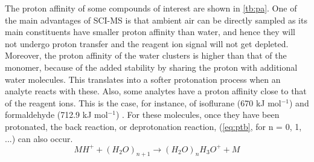 The proton affinity of some compounds of interest are shown in \autoref{tb:pa}. One of the main advantages of SCI-MS is that ambient air can be directly sampled as its main constituents have smaller proton affinity than water, %
and hence they will not undergo proton transfer and the reagent ion signal will not get depleted.
Moreover, the proton affinity of the water clusters is higher than that of the monomer, because of the added stability by sharing the proton with additional water molecules.
This translates into a softer protonation process when an analyte reacts with these. 
%
Also, some analytes have a proton affinity close to that of the reagent ions.
This is the case, for instance, of isoflurane (670 kJ mol$^{-1}$) and formaldehyde (712.9 kJ mol$^{-1}$) \cite{ISOF_paper}.
For these molecules, once they have been protonated,  the back reaction, or deprotonation reaction, (\autoref{eq:ptb}, for n = 0, 1, ...) can also occur.
\begin{equation}
\label{eq:ptb}
MH^+ + (H_2O)_{n+1} \rightarrow (H_2O)_{n}H_3O^+ + M
\end{equation}




